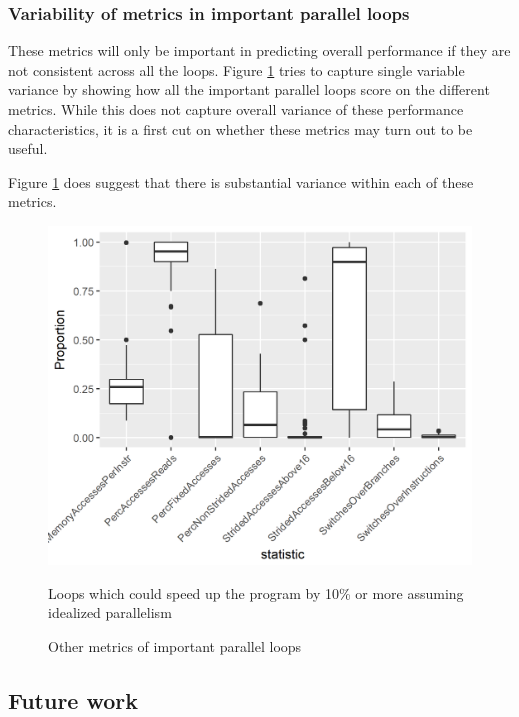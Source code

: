 \documentclass[12pt,twoside]{reedthesis}
\begin{document}
		\subsubsection{Variability of metrics in important parallel loops}
		
		These metrics will only be important in predicting overall performance if they are not consistent across all the loops. Figure \ref{fig:other-metrics} tries to capture single variable variance by showing how all the important parallel loops score on the different metrics. While this does not capture overall variance of these performance characteristics, it is a first cut on whether these metrics may turn out to be useful. 
		
		Figure \ref{fig:other-metrics} does suggest that there is substantial variance within each of these metrics.
		
		\begin{figure}
			\caption{Other metrics of important parallel loops}
			\label{fig:other-metrics}
			
			\begin{minipage}{0.6\textwidth} %
				\includegraphics[scale=0.7]{plots/stats_variablility_plot.png}
				{\footnotesize Loops which could speed up the program by 10\% or more assuming idealized parallelism \par}
			\end{minipage}
		\end{figure}
	
		\subsection{Future work}
		
\end{document}
